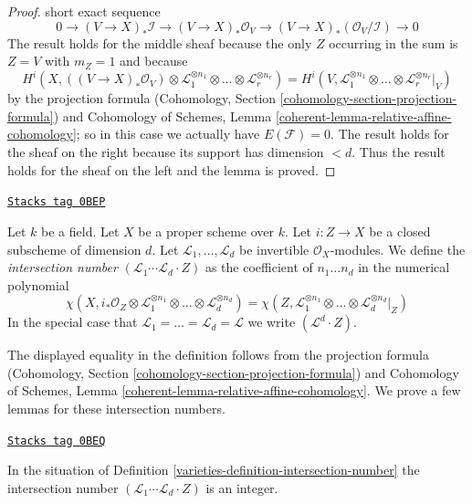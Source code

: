 \begin{proof}
short exact sequence
$$
0 \to (V \to X)_*\mathcal{I} \to (V \to X)_*\mathcal{O}_V
\to (V \to X)_*(\mathcal{O}_V/\mathcal{I}) \to 0
$$
The result holds for the middle sheaf because
the only $Z$ occurring in the sum is $Z = V$
with $m_Z = 1$ and because
$$
H^i(X, ((V \to X)_*\mathcal{O}_V) \otimes
 \mathcal{L}_1^{\otimes n_1} \otimes \ldots \otimes
\mathcal{L}_r^{\otimes n_r}) =
H^i(V,  \mathcal{L}_1^{\otimes n_1} \otimes \ldots \otimes
\mathcal{L}_r^{\otimes n_r}|_V)
$$
by the projection formula
(Cohomology, Section \ref{cohomology-section-projection-formula}) and
Cohomology of Schemes, Lemma
\ref{coherent-lemma-relative-affine-cohomology};
so in this case we actually have $E(\mathcal{F}) = 0$.
The result holds for the sheaf on the right because its support
has dimension $< d$. Thus the result holds for the sheaf on the
left and the lemma is proved.
\end{proof}

\begin{definition}
\label{varieties-definition-intersection-number}
\href{https://stacks.math.columbia.edu/tag/0BEP}{\texttt{Stacks tag 0BEP}}

Let $k$ be a field. Let $X$ be a proper scheme over $k$. Let
$i : Z \to X$ be a closed subscheme of dimension $d$. Let
$\mathcal{L}_1, \ldots, \mathcal{L}_d$ be invertible
$\mathcal{O}_X$-modules. We define the {\it intersection number}
$(\mathcal{L}_1 \cdots \mathcal{L}_d \cdot Z)$
as the coefficient of $n_1 \ldots n_d$ in the numerical polynomial
$$
\chi(X, i_*\mathcal{O}_Z \otimes \mathcal{L}_1^{\otimes n_1} \otimes
\ldots \otimes \mathcal{L}_d^{\otimes n_d}) =
\chi(Z, \mathcal{L}_1^{\otimes n_1} \otimes
\ldots \otimes \mathcal{L}_d^{\otimes n_d}|_Z)
$$
In the special
case that $\mathcal{L}_1 = \ldots = \mathcal{L}_d = \mathcal{L}$
we write $(\mathcal{L}^d \cdot Z)$.
\end{definition}

The displayed equality in the definition follows from
the projection formula
(Cohomology, Section \ref{cohomology-section-projection-formula}) and
Cohomology of Schemes, Lemma
\ref{coherent-lemma-relative-affine-cohomology}.
We prove a few lemmas for these intersection numbers.

\begin{lemma}
\label{varieties-lemma-intersection-number-integer}
\href{https://stacks.math.columbia.edu/tag/0BEQ}{\texttt{Stacks tag 0BEQ}}

In the situation of Definition \ref{varieties-definition-intersection-number}
the intersection number
$(\mathcal{L}_1 \cdots \mathcal{L}_d \cdot Z)$
is an integer.
\end{lemma}

